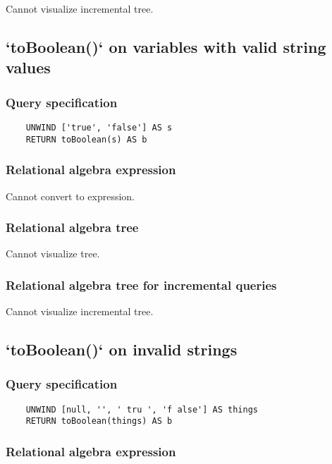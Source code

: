 	Cannot visualize incremental tree.
	\subsection{`toBoolean()` on variables with valid string values}

	\subsubsection*{Query specification}

	\begin{lstlisting}
	UNWIND ['true', 'false'] AS s
	RETURN toBoolean(s) AS b
	\end{lstlisting}


	\subsubsection*{Relational algebra expression}

	Cannot convert to expression.

	\subsubsection*{Relational algebra tree}

	Cannot visualize tree.

	\subsubsection*{Relational algebra tree for incremental queries}

	Cannot visualize incremental tree.
	\subsection{`toBoolean()` on invalid strings}

	\subsubsection*{Query specification}

	\begin{lstlisting}
	UNWIND [null, '', ' tru ', 'f alse'] AS things
	RETURN toBoolean(things) AS b
	\end{lstlisting}


	\subsubsection*{Relational algebra expression}

